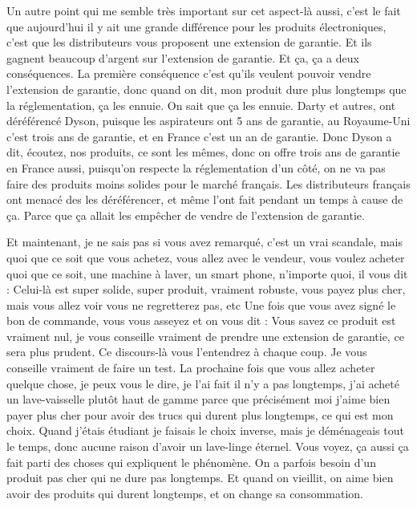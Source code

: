 \begin{small}
Un autre point qui me semble très important sur cet aspect-là aussi, c'est le fait que aujourd'hui il y ait une grande différence pour les produits électroniques, c'est que les distributeurs vous proposent une extension de garantie. Et ils gagnent beaucoup d'argent sur l'extension de garantie. Et ça, ça a deux conséquences. La première conséquence c'est qu'ils veulent pouvoir vendre l'extension de garantie, donc quand on dit, mon produit dure plus longtemps que la réglementation, ça les ennuie. On sait que ça les ennuie. Darty et autres, ont déréférencé Dyson, puisque les aspirateurs ont 5 ans de garantie, au Royaume-Uni c'est trois ans de garantie, et en France c'est un an de garantie. Donc Dyson a dit, écoutez, nos produits, ce sont les mêmes, donc on offre trois ans de garantie en France aussi, puisqu'on respecte la réglementation d'un côté, on ne va pas faire des produits moins solides pour le marché français. Les distributeurs français ont menacé des les déréférencer, et même l'ont fait pendant un temps à cause de ça. Parce que ça allait les empêcher de vendre de l'extension de garantie. 

Et maintenant, je ne sais pas si vous avez remarqué, c'est un vrai scandale, mais quoi que ce soit que vous achetez, vous allez avec le vendeur, vous voulez acheter quoi que ce soit, une machine à laver, un smart phone, n'importe quoi, il vous dit : \og Celui-là est super solide, super produit, vraiment robuste, vous payez plus cher, mais vous allez voir vous ne regretterez pas, etc\fg{} Une fois que vous avez signé le bon de commande, vous vous asseyez et on vous dit : \og Vous savez ce produit est vraiment nul, je vous conseille vraiment de prendre une extension de garantie, ce sera plus prudent\fg{}. Ce discours-là vous l'entendrez à chaque coup. Je vous conseille vraiment de faire un test. La prochaine fois que vous allez acheter quelque chose, je peux vous le dire, je l'ai fait il n'y a pas longtemps, j'ai acheté un lave-vaisselle plutôt haut de gamme parce que précisément moi j'aime bien payer plus cher pour avoir des trucs qui durent plus longtemps, ce qui est mon choix. Quand j'étais étudiant je faisais le choix inverse, mais je déménageais tout le temps, donc aucune raison d'avoir un lave-linge éternel. Vous voyez, ça aussi ça fait parti des choses qui expliquent le phénomène. On a parfois besoin d'un produit pas cher qui ne dure pas longtemps. Et quand on vieillit, on aime bien avoir des produits qui durent longtemps, et on change sa consommation. 


\end{small}
